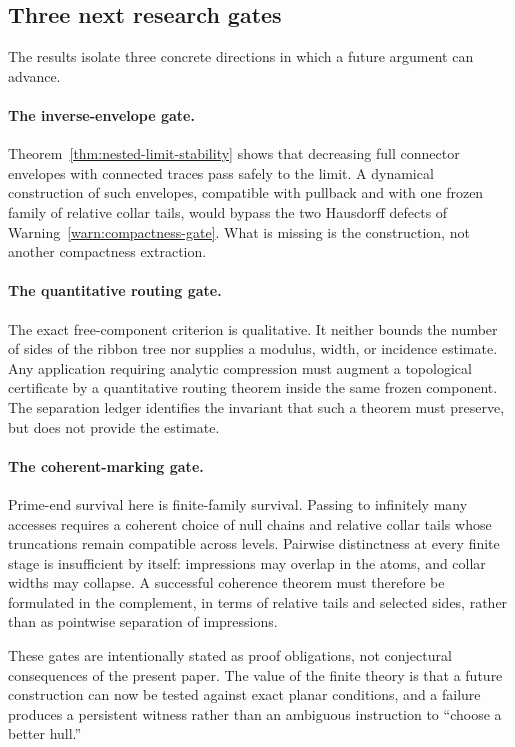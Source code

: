 \documentclass[11pt,reqno]{amsart}
\theoremstyle{definition}
\theoremstyle{remark}
\begin{document}
\subsection{Three next research gates}

The results isolate three concrete directions in which a future argument can
advance.

\paragraph{The inverse-envelope gate.}
Theorem~\ref{thm:nested-limit-stability} shows that decreasing full connector
envelopes with connected traces pass safely to the limit.  A dynamical
construction of such envelopes, compatible with pullback and with one frozen
family of relative collar tails, would bypass the two Hausdorff defects of
Warning~\ref{warn:compactness-gate}.  What is missing is the construction,
not another compactness extraction.

\paragraph{The quantitative routing gate.}
The exact free-component criterion is qualitative.  It neither bounds the
number of sides of the ribbon tree nor supplies a modulus, width, or
incidence estimate.  Any application requiring analytic compression must
augment a topological certificate by a quantitative routing theorem inside
the same frozen component.  The separation ledger identifies the invariant
that such a theorem must preserve, but does not provide the estimate.

\paragraph{The coherent-marking gate.}
Prime-end survival here is finite-family survival.  Passing to infinitely
many accesses requires a coherent choice of null chains and relative
collar tails whose truncations remain compatible across levels.  Pairwise
distinctness at every finite stage is insufficient by itself: impressions
may overlap in the atoms, and collar widths may collapse.  A successful
coherence theorem must therefore be formulated in the complement, in terms
of relative tails and selected sides, rather than as pointwise separation of
impressions.

These gates are intentionally stated as proof obligations, not conjectural
consequences of the present paper.  The value of the finite theory is that a
future construction can now be tested against exact planar conditions, and a
failure produces a persistent witness rather than an ambiguous instruction
to ``choose a better hull.''
\end{document}
